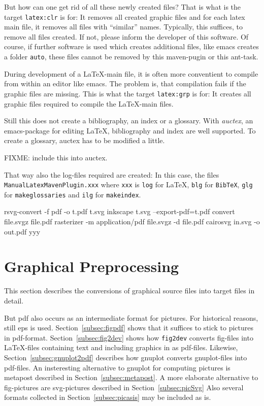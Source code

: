 \documentclass[12pt]{article}
\begin{document}
But how can one get rid of all these newly created files? 
That is what is the target {\tt latex:clr} is for: 
It removes all created graphic files 
and for each latex main file, it removes all files with ``similar'' names. 
Typically, this suffices, to remove all files created. 
If not, please inform the developer of this software. 
Of course, if further software is used which creates additional files, 
like emacs creates a folder {\tt auto}, 
these files cannot be removed by this maven-pugin or this ant-task. 

During development of a \LaTeX-main file, 
it is often more conventient to compile from within an editor like emacs. 
The problem is, that compilation fails if the graphic files are missing. 
This is what the target {\tt latex:grp} is for: 
It creates all graphic files required to compile the \LaTeX-main files. 

Still this does not create a bibliography, an index or a glossary. 
With {\em auctex}, an emacs-package for editing \LaTeX, 
bibliography and index are well supported. 
To create a glossary, auctex has to be modified a little. 

FIXME: include this into auctex. 

That way also the log-files required are created: 
In this case, the files {\tt ManualLatexMavenPlugin.xxx} 
where {\tt xxx} is {\tt log} for \LaTeX, {\tt blg} for {\tt BibTeX}, 
{\tt glg} for {\tt makeglossaries} and {\tt ilg} for {\tt makeindex}. 


rsvg-convert -f pdf -o t.pdf t.svg
inkscape t.svg --export-pdf=t.pdf
convert file.svgz file.pdf 
rasterizer -m application/pdf file.svgz -d file.pdf
cairosvg in.svg -o out.pdf
yyy

\section{Graphical Preprocessing}\label{sec:GraphConversions}

This section describes the conversions of 
graphical source files into target files 
in detail. 

But pdf also occurs as an intermediate format for pictures. 
For historical reasons, still \gls{eps} is used. 
Section~\ref{subsec:figpdf} shows that it suffices to stick to pictures 
in pdf-format. 
Section~\ref{subsec:fig2dev} shows how {\tt fig2dev} converts fig-files 
into \LaTeX-files containing text and including graphics in as pdf-files. 
Likewise, Section~\ref{subsec:gnuplot2pdf} describes 
how gnuplot converts gnuplot-files into pdf-files. 
An insteresting alternative to gnuplot for computing pictures 
is metapost described in Section~\ref{subsec:metapost}. 
A more elaborate alternative to fig-pictures are svg-pictures 
described in Section~\ref{subsec:picSvg}
Also several formats collected in Section~\ref{subsec:picasis} 
may be included as is. 
\end{document}
